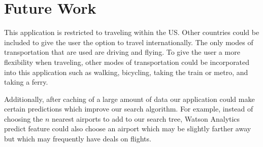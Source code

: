 \documentclass[11pt]{article}
\begin{document}
\section{Future Work}
This application is restricted to traveling within the US. Other countries could be included to give the user the option to travel internationally. The only modes of transportation that are used are driving and flying. To give the user a more flexibility when traveling, other modes of transportation could be incorporated into this application such as walking, bicycling, taking the train or metro, and taking a ferry.

Additionally, after caching of a large amount of data our application could make certain predictions which improve our search algorithm.  For example, instead of choosing the $n$ nearest airports to add to our search tree, Watson Analytics predict feature could also choose an airport which may be slightly farther away but which may frequently have deals on flights.
				
\end{document}
